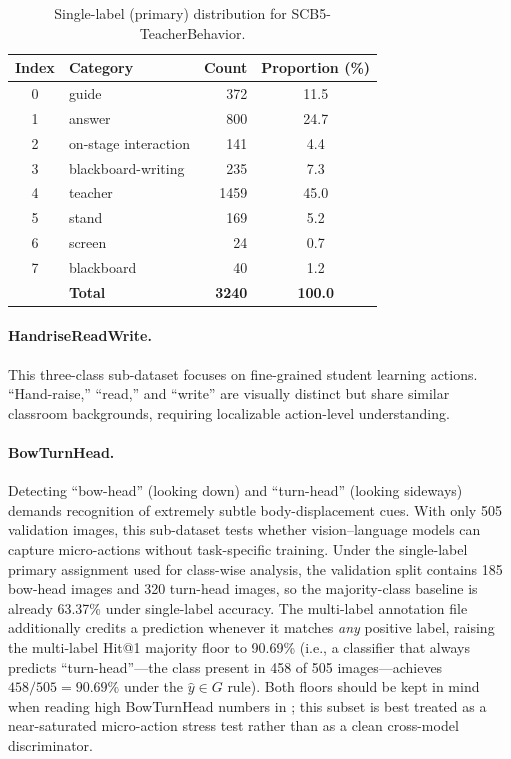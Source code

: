 \documentclass[electronics,article,submit,pdftex,moreauthors]{Definitions/mdpi}
\begin{document}
\begin{table}[H]
\caption{Single-label (primary) distribution for SCB5-TeacherBehavior.}
\label{tab:dataset_single}
\centering
\begin{tabular}{clrc}
\toprule
\textbf{Index} & \textbf{Category} & \textbf{Count} & \textbf{Proportion (\%)} \\
\midrule
0 & guide & 372 & 11.5 \\
1 & answer & 800 & 24.7 \\
2 & on-stage interaction & 141 & 4.4 \\
3 & blackboard-writing & 235 & 7.3 \\
4 & teacher & 1459 & 45.0 \\
5 & stand & 169 & 5.2 \\
6 & screen & 24 & 0.7 \\
7 & blackboard & 40 & 1.2 \\
\midrule
  & \textbf{Total} & \textbf{3240} & \textbf{100.0} \\
\bottomrule
\end{tabular}
\end{table}

\paragraph{HandriseReadWrite.}
This three-class sub-dataset focuses on fine-grained student learning actions.
``Hand-raise,'' ``read,'' and ``write'' are visually distinct but share similar classroom backgrounds, requiring localizable action-level understanding.

\paragraph{BowTurnHead.}
Detecting ``bow-head'' (looking down) and ``turn-head'' (looking sideways) demands recognition of extremely subtle body-displacement cues.
With only 505 validation images, this sub-dataset tests whether vision--language models can capture micro-actions without task-specific training. Under the single-label primary assignment used for class-wise analysis, the validation split contains 185 bow-head images and 320 turn-head images, so the majority-class baseline is already 63.37\% under single-label accuracy. The multi-label annotation file additionally credits a prediction whenever it matches \emph{any} positive label, raising the multi-label Hit@1 majority floor to 90.69\% (i.e., a classifier that always predicts ``turn-head''---the class present in 458 of 505 images---achieves $458/505 = 90.69\%$ under the $\hat{y}\in G$ rule). Both floors should be kept in mind when reading high BowTurnHead numbers in ; this subset is best treated as a near-saturated micro-action stress test rather than as a clean cross-model discriminator.
\end{document}
